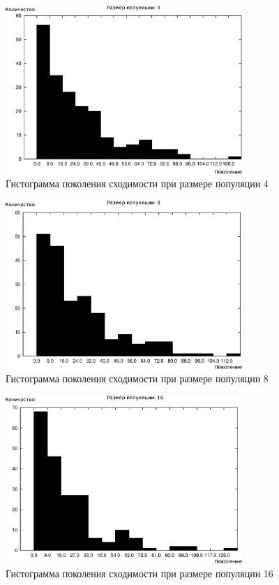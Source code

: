 \begin{figure}[h!]
\centering
\includegraphics[width=0.8\textwidth]{science/histogram4}
\caption{Гистограмма поколения сходимости при размере популяции 4}
\label{figure:histogram4}
\end{figure}

\begin{figure}[h!]
\centering
\includegraphics[width=0.8\textwidth]{science/histogram8}
\caption{Гистограмма поколения сходимости при размере популяции 8}
\label{figure:histogram8}
\end{figure}

\begin{figure}[h!]
\centering
\includegraphics[width=0.8\textwidth]{science/histogram16}
\caption{Гистограмма поколения сходимости при размере популяции 16}
\label{figure:histogram16}
\end{figure}

